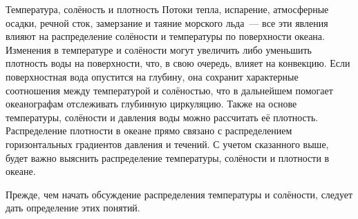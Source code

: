 
\begin{chapter}{Температура, солёность и плотность}\label{chap:6}
Потоки тепла, испарение, атмосферные осадки, речной сток, замерзание и таяние
морского льда~--- все эти явления влияют на распределение солёности 
и температуры по поверхности океана. Изменения в температуре и солёности 
могут увеличить либо уменьшить плотность воды на поверхности, что, 
в свою очередь, влияет на конвекцию. Если поверхностная вода опустится на
глубину, она сохранит характерные соотношения между температурой и солёностью, 
что в дальнейшем помогает океанографам отслеживать глубинную циркуляцию.
Также на основе температуры, солёности и давления воды можно рассчитать её
плотность. Распределение плотности в океане прямо связано с распределением
горизонтальных градиентов давления и течений. С учетом сказанного выше,
будет важно выяснить распределение температуры, солёности и плотности в океане.
%

Прежде, чем начать обсуждение распределения температуры и солёности,
следует дать определение этих понятий.
%



\end{chapter}
